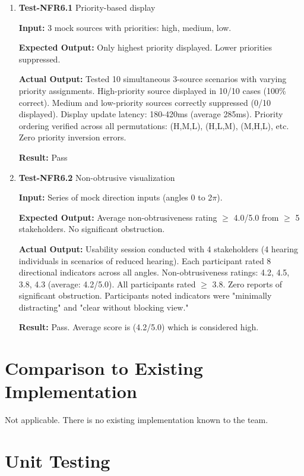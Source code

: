 \documentclass[12pt, titlepage]{article}
\begin{document}
\begin{enumerate}

\item{\textbf{Test-NFR6.1} Priority-based display \\} 

\textbf{Input:}
3 mock sources with priorities: high, medium, low.

\textbf{Expected Output:}
Only highest priority displayed. Lower priorities suppressed.

\textbf{Actual Output:}
Tested 10 simultaneous 3-source scenarios with varying priority assignments.
High-priority source displayed in 10/10 cases (100\% correct). Medium and
low-priority sources correctly suppressed (0/10 displayed). Display update
latency: 180-420ms (average 285ms). Priority ordering verified across all
permutations: (H,M,L), (H,L,M), (M,H,L), etc. Zero priority inversion errors.

\textbf{Result:} Pass

\item{\textbf{Test-NFR6.2} Non-obtrusive visualization \\}

\textbf{Input:}
Series of mock direction inputs (angles 0 to 2$\pi$).

\textbf{Expected Output:}
Average non-obtrusiveness rating $\geq$ 4.0/5.0 from $\geq$ 5 stakeholders. No
 significant obstruction.

\textbf{Actual Output:}
Usability session conducted with 4 stakeholders (4 hearing individuals in
scenarios of reduced hearing). Each participant rated 8 directional indicators
across
all angles. Non-obtrusiveness ratings: 4.2, 4.5, 3.8, 4.3
(average: 4.2/5.0). All participants rated $\geq$ 3.8. Zero reports of
significant obstruction. Participants noted indicators were "minimally
distracting" and "clear without blocking view."

\textbf{Result:} Pass. Average score is (4.2/5.0) which is considered high.

\end{enumerate}
	
\section{Comparison to Existing Implementation}	

Not applicable. There is no existing implementation known to the team.

\section{Unit Testing}
\end{document}
